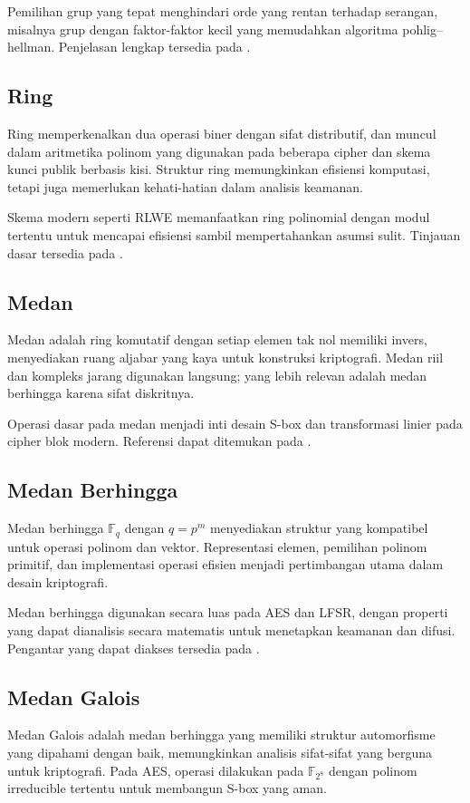 \documentclass[../main.tex]{subfiles}
\begin{document}
Pemilihan grup yang tepat menghindari orde yang rentan terhadap serangan, misalnya grup dengan faktor-faktor kecil yang memudahkan algoritma pohlig–hellman. Penjelasan lengkap tersedia pada \textcite{menezes1996handbook}.

\subsection{Ring}
Ring memperkenalkan dua operasi biner dengan sifat distributif, dan muncul dalam aritmetika polinom yang digunakan pada beberapa cipher dan skema kunci publik berbasis kisi. Struktur ring memungkinkan efisiensi komputasi, tetapi juga memerlukan kehati-hatian dalam analisis keamanan.

Skema modern seperti RLWE memanfaatkan ring polinomial dengan modul tertentu untuk mencapai efisiensi sambil mempertahankan asumsi sulit. Tinjauan dasar tersedia pada \textcite{menezes1996handbook}.

\subsection{Medan}
Medan adalah ring komutatif dengan setiap elemen tak nol memiliki invers, menyediakan ruang aljabar yang kaya untuk konstruksi kriptografi. Medan riil dan kompleks jarang digunakan langsung; yang lebih relevan adalah medan berhingga karena sifat diskritnya.

Operasi dasar pada medan menjadi inti desain S-box dan transformasi linier pada cipher blok modern. Referensi dapat ditemukan pada \textcite{menezes1996handbook}.

\subsection{Medan Berhingga}
Medan berhingga \(\mathbb{F}_q\) dengan \(q=p^m\) menyediakan struktur yang kompatibel untuk operasi polinom dan vektor. Representasi elemen, pemilihan polinom primitif, dan implementasi operasi efisien menjadi pertimbangan utama dalam desain kriptografi.

Medan berhingga digunakan secara luas pada AES dan LFSR, dengan properti yang dapat dianalisis secara matematis untuk menetapkan keamanan dan difusi. Pengantar yang dapat diakses tersedia pada \textcite{menezes1996handbook}.

\subsection{Medan Galois}
Medan Galois adalah medan berhingga yang memiliki struktur automorfisme yang dipahami dengan baik, memungkinkan analisis sifat-sifat yang berguna untuk kriptografi. Pada AES, operasi dilakukan pada \(\mathbb{F}_{2^8}\) dengan polinom irreducible tertentu untuk membangun S-box yang aman.
\end{document}
